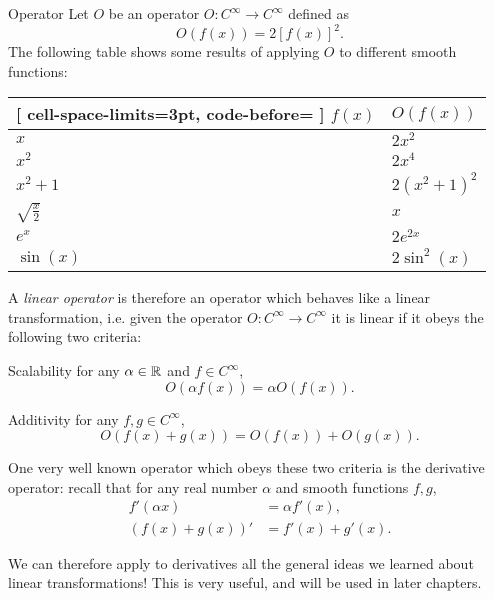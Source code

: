 \begin{example}{Operator}{}
	Let $O$ be an operator $O:C^{\infty}\to C^{\infty}$ defined as
	\[
		O \left( f(x) \right) = 2\left[f(x)\right]^{2}.
	\]
	The following table shows some results of applying $O$ to different smooth functions:
	\begin{center}
		\begin{NiceTabular}{ll}[
			cell-space-limits=3pt, code-before= 
			]
			\toprule
			\RowStyle{\bfseries}$f(x)$ & $O \left( f(x) \right)$\\
			\midrule
			$x$ & $2x^{2}$\\
			$x^{2}$ & $2x^{4}$\\
			$x^{2}+1$ & $2 \left( x^{2}+1 \right)^{2}$\\
			$\sqrt{\frac{x}{2}}$ & $x$\\
			$e^{x}$ & $2e^{2x}$\\
			$\sin(x)$ & $2\sin^{2}(x)$\\
			\bottomrule
		\end{NiceTabular}
	\end{center}
\end{example}

A \emph{linear operator} is therefore an operator which behaves like a linear transformation, i.e. given the operator $O:C^{\infty}\to C^{\infty}$ it is linear if it obeys the following two criteria:
\begin{descitemize}
	\item[Scalability] for any $\alpha\in\mathbb{R}^{}$ and $f\in C^{\infty}$,
		\[
			O \left( \alpha f(x) \right) = \alpha O \left( f(x) \right).
		\]
	\item[Additivity] for any $f,g\in C^{\infty}$,
		\[
			O \left( f(x)+g(x) \right) = O \left( f(x) \right) + O \left( g(x) \right).
		\]
\end{descitemize}

One very well known operator which obeys these two criteria is the derivative operator: recall that for any real number $\alpha$ and smooth functions $f,g$,
\begin{align}
	f' \left( \alpha x \right) &= \alpha f'(x)\nonumber,\\
	\left( f(x)+g(x) \right)' &= f'(x) + g'(x).
	\label{eq:derivative_as_linear_opeator}
\end{align}

We can therefore apply to derivatives all the general ideas we learned about linear transformations! This is very useful, and will be used in later chapters.


